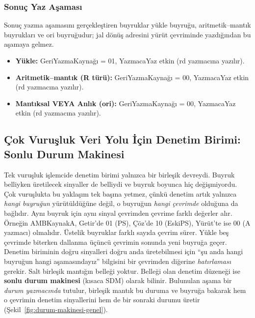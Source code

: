 \subsubsection{Sonuç Yaz Aşaması}

Sonuç yazma aşamasını gerçekleştiren buyruklar yükle buyruğu, aritmetik--mantık buyrukları ve ori buyruğudur; jal dönüş adresini yürüt çevriminde yazdığından bu aşamaya gelmez.
\begin{itemize}
    \item \textbf{Yükle:} GeriYazmaKaynağı = 01, YazmacaYaz etkin (rd yazmacına yazılır).
    \item \textbf{Aritmetik--mantık (R türü):} GeriYazmaKaynağı = 00, YazmacaYaz etkin (rd yazmacına yazılır).
    \item \textbf{Mantıksal VEYA Anlık (ori):} GeriYazmaKaynağı = 00, YazmacaYaz etkin (rd yazmacına yazılır).
\end{itemize}

\subsection{Çok Vuruşluk Veri Yolu İçin Denetim Birimi: Sonlu Durum Makinesi}
\label{subsec:sinirli-durum-makinesi}

Tek vuruşluk işlemcide denetim birimi yalnızca bir birleşik devreydi. Buyruk belliyken üretilecek sinyaller de belliydi ve buyruk boyunca hiç değişmiyordu. Çok vuruşlukta bu yaklaşım tek başına yetmez, çünkü denetim artık yalnızca \emph{hangi buyruğun} yürütüldüğüne değil, o buyruğun \emph{hangi çevrimde} olduğuna da bağlıdır. Aynı buyruk için aynı sinyal çevrimden çevrime farklı değerler alır. Örneğin AMBKaynakA, Getir'de 01 (PS), Çöz'de 10 (EskiPS), Yürüt'te ise 00 (A yazmacı) olmalıdır. Üstelik buyruklar farklı sayıda çevrim sürer. Yükle beş çevrimde biterken dallanma üçüncü çevrimin sonunda yeni buyruğa geçer. Denetim biriminin doğru sinyalleri doğru anda üretebilmesi için ``şu anda hangi buyruğun hangi aşamasındayız'' bilgisini bir çevrimden diğerine \emph{hatırlaması} gerekir. Salt birleşik mantığın belleği yoktur. Belleği olan denetim düzeneği ise \textbf{sonlu durum makinesi} (kısaca SDM) olarak bilinir. Bulunulan aşama bir \emph{durum yazmacında} tutulur, birleşik mantık bu duruma ve buyruğa bakarak hem o çevrimin denetim sinyallerini hem de bir sonraki durumu üretir (Şekil~\ref{fig:durum-makinesi-genel}).

